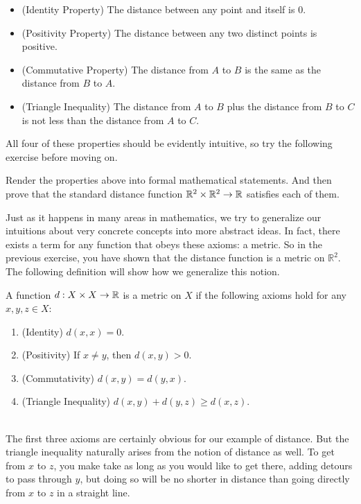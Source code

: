 \begin{itemize}
    \item (Identity Property) The distance between any point and itself is $0$.
    \item (Positivity Property) The distance between any two distinct points is positive. 
    \item (Commutative Property) The distance from $A$ to $B$ is the same as the distance from $B$ to $A$.
    \item (Triangle Inequality) The distance from $A$ to $B$ plus the distance from $B$ to $C$ is not less than the distance from $A$ to $C$.
\end{itemize}

All four of these properties should be evidently intuitive, so try the following exercise before moving on.\\

\begin{exercise}
    Render the properties above into formal mathematical statements. And then prove that the standard distance function $\mathbb{R}^2\times\mathbb{R}^2\to\mathbb{R}$ satisfies each of them.
\end{exercise}

Just as it happens in many areas in mathematics, we try to generalize our intuitions about very concrete concepts into more abstract ideas. In fact, there exists a term for any function that obeys these axioms: a metric. So in the previous exercise, you have shown that the distance function is a metric on $\mathbb{R}^2$. The following definition will show how we generalize this notion.\\

\begin{definition}[A metric on $X$]
    A function $d: X\times X \to \mathbb{R}$ is a metric on $X$ if the following axioms hold for any $x,y,z\in X$:
    \begin{enumerate}
        \item (Identity) $d(x,x)=0$. 
        \item (Positivity) If $x\neq y$, then $d(x,y)>0$. 
        \item (Commutativity) $d(x,y)=d(y,x)$. 
        \item (Triangle Inequality) $d(x,y)+d(y,z)\geq d(x,z)$. 
    \end{enumerate}
\end{definition}\\


The first three axioms are certainly obvious for our example of distance. But the triangle inequality naturally arises from the notion of distance as well. To get from $x$ to $z$, you make take as long as you would like to get there, adding detours to pass through $y$, but doing so will be no shorter in distance than going directly from $x$ to $z$ in a straight line. \\











